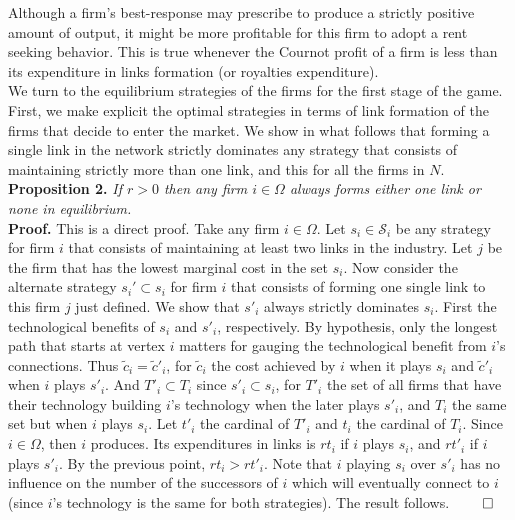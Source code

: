 \documentclass{article}
\begin{document}
\indent Although a firm's best-response may prescribe to produce a strictly positive amount of output, it might be more profitable for this firm to adopt a rent seeking behavior. This is true whenever the Cournot profit of a firm is less than its expenditure in links formation (or royalties expenditure). \\

\indent We turn to the equilibrium strategies of the firms for the first stage of the game. First, we make explicit the optimal strategies in terms of link formation of the firms that decide to enter the market. We show in what follows that forming a single link in the network strictly dominates any strategy that consists of maintaining strictly more than one link, and this for all the firms in $N$. \\

\textbf{Proposition 2.} \textit{If $r>0$ then any firm $i\in \Omega$ always forms either one link or none in equilibrium. }\\

\indent \textbf{Proof.} This is a direct proof. Take any firm $i\in \Omega$. Let $s_i\in \mathcal{S}_i$ be any strategy for firm $i$ that consists of maintaining at least two links in the industry. Let $j$ be the firm that has the lowest marginal cost in the set $s_i$. Now consider the alternate strategy $s_i'\subset s_i$  for firm $i$ that consists of forming one single link to this firm $j$ just defined. We show that $s'_i$ always strictly dominates $s_i$. First the technological benefits of $s_i$ and $s'_i$, respectively. By hypothesis, only the longest path that starts at vertex $i$ matters for gauging the technological benefit from $i$'s connections. Thus $\tilde{c}_i=\tilde{c}'_i$, for $\tilde{c}_i$ the cost achieved by $i$ when it plays $s_i$ and $\tilde{c}'_i$ when $i$ plays $s'_i$. And $T'_i\subset T_i$ since $s'_i\subset s_i$, for $T'_i$ the set of all firms that have their technology building $i$'s technology when the later plays $s'_i$, and $T_i$ the same set but when $i$ plays $s_i$. Let $t'_i$ the cardinal of $T'_i$ and $t_i$ the cardinal of $T_i$. Since $i\in \Omega$, then $i$ produces. Its expenditures in links is $rt_i$ if $i$ plays $s_i$, and $rt'_i$ if $i$ plays $s'_i$. By the previous point, $rt_i>rt'_i$. Note that $i$ playing $s_i$ over $s'_i$ has no influence on the number of the successors of $i$ which will eventually connect to $i$ (since $i$'s technology is the same for both strategies). The result follows. $ \qed$\\  
\end{document}
